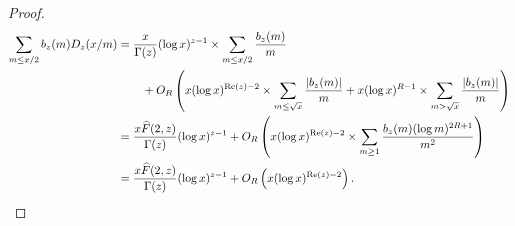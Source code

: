 \documentclass[11pt,reqno,a4letter]{article}
\numberwithin{figure}{section}
\numberwithin{table}{section}
\theoremstyle{plain}
\numberwithin{theorem}{section}
\theoremstyle{definition}
\renewcommand{\Re}{\operatorname{Re}}
\begin{document}
\begin{proof}
\begin{align*} 
\sum_{m \leq x/2} b_z(m) D_z(x/m) & = \frac{x}{\Gamma(z)} (\log x)^{z-1} \times 
     \sum_{m \leq x/2} \frac{b_z(m)}{m} \\ 
     & \phantom{=\quad\ } + 
     O_R\left(x (\log x)^{\Re(z)-2} \times \sum_{m \leq \sqrt{x}} \frac{|b_z(m)|}{m} + 
     x (\log x)^{R-1} \times \sum_{m > \sqrt{x}} \frac{|b_z(m)|}{m}\right) \\ 
     & = \frac{x \widehat{F}(2, z)}{\Gamma(z)} (\log x)^{z-1} + O_R\left( 
     x (\log x)^{\Re(z)-2} \times \sum_{m \geq 1} \frac{b_z(m) (\log m)^{2R+1}}{m^2} 
     \right) \\ 
     & = \frac{x \widehat{F}(2, z)}{\Gamma(z)} (\log x)^{z-1} + O_{R}\left( 
     x (\log x)^{\Re(z)-2}\right). 
     \qedhere  
\end{align*} 
\end{proof} 
\end{document}
